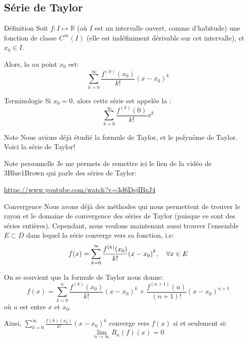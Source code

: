 \documentclass[a4paper]{article}
\begin{document}
\subsection{Série de Taylor}
\begin{parag}{Définition}
    Soit $f : I \mapsto \mathbb{R}$ (où $I$ est un intervalle ouvert, comme d'habitude) une fonction de classe $C^{\infty}\left(I\right)$ (elle est indéfiniment dérivable sur cet intervalle), et $x_0 \in I$.

    Alors, la  au point $x_0$ est: 
    \[\sum_{k=0}^{\infty} \frac{f^{\left(k\right)}\left(x_0\right)}{k!}\left(x - x_0\right)^{k}\]

    \begin{subparag}{Terminologie}
        Si $x_0 = 0$, alors cette série est appelée la : 
        \[\sum_{k=0}^{\infty} \frac{f^{\left(k\right)}\left(0\right)}{k!}x^k\]
        
    \end{subparag}
    
    \begin{subparag}{Note}
        Nous avions déjà étudié la formule de Taylor, et le polynôme de Taylor. Voici la série de Taylor!
    \end{subparag}

    \begin{subparag}{Note personnelle}
        Je me permets de remettre ici le lien de la vidéo de 3Blue1Brown qui parle des séries de Taylor:
        \begin{center}
            \url{https://www.youtube.com/watch?v=3d6DsjIBzJ4}
        \end{center}
    \end{subparag}
    
\end{parag}

\begin{parag}{Convergence}
    Nous avons déjà des méthodes qui nous permettent de trouver le rayon et le domaine de convergence des séries de Taylor (puisque ce sont des séries entières). Cependant, nous voulons maintenant aussi trouver l'ensemble $E \subset D$ dans lequel la série converge vers sa fonction, i.e:
    \[f\left(x\right) = \sum_{k=0}^{\infty} \frac{f^{\left(k\right)}\left(x_0\right)}{k!}\left(x - x_0\right)^k, \mathspace \forall x \in E\]

    On se souvient que la formule de Taylor nous donne: 
    \[f\left(x\right) = \sum_{k=0}^{n} \frac{f^{\left(k\right)}\left(x_0\right)}{k!}\left(x - x_0\right)^k + \frac{f^{\left(n+1\right)}\left(u\right)}{\left(n+1\right)!}\left(x - x_0\right)^{n+1}\]
    où $u$ est entre $x$ et $x_0$.

    Ainsi, $\sum_{k=0}^{\infty} \frac{f\left(k\right)\left(x_0\right)}{k!}\left(x - x_0\right)^k$ converge vers $f\left(x\right)$ si et seulement si: 
    \[\lim_{n \to \infty} R_n\left(f\right)\left(x\right) = 0\]
    
\end{parag}
\end{document}
